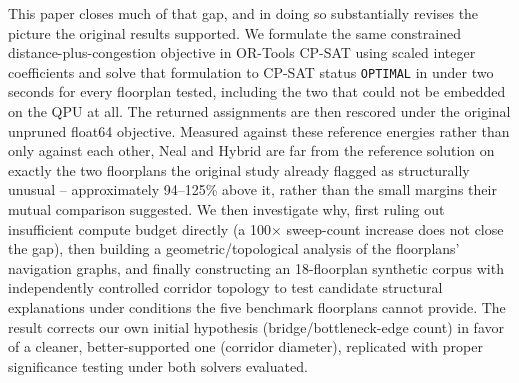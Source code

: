 \documentclass[11pt]{article}
\begin{document}
This paper closes much of that gap, and in doing so substantially revises the picture the original results supported. We formulate the same constrained distance-plus-congestion objective in OR-Tools CP-SAT using scaled integer coefficients and solve that formulation to CP-SAT status \texttt{OPTIMAL} in under two seconds for every floorplan tested, including the two that could not be embedded on the QPU at all. The returned assignments are then rescored under the original unpruned float64 objective. Measured against these reference energies rather than only against each other, Neal and Hybrid are far from the reference solution on exactly the two floorplans the original study already flagged as structurally unusual -- approximately 94--125\% above it, rather than the small margins their mutual comparison suggested. We then investigate why, first ruling out insufficient compute budget directly (a 100$\times$ sweep-count increase does not close the gap), then building a geometric/topological analysis of the floorplans' navigation graphs, and finally constructing an 18-floorplan synthetic corpus with independently controlled corridor topology to test candidate structural explanations under conditions the five benchmark floorplans cannot provide. The result corrects our own initial hypothesis (bridge/bottleneck-edge count) in favor of a cleaner, better-supported one (corridor diameter), replicated with proper significance testing under both solvers evaluated.
\end{document}
